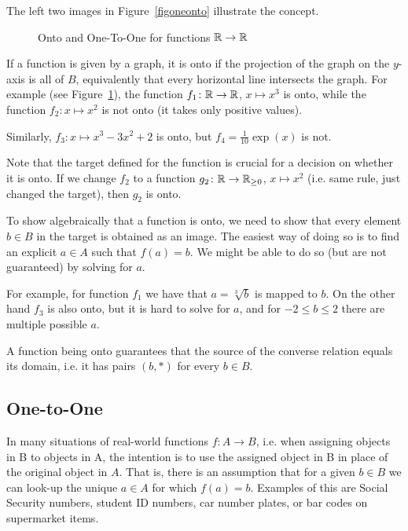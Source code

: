 The left two images in Figure~\ref{figoneonto} illustrate the concept.

\begin{figure}[t]
\begin{center}
\caption{Onto and One-To-One for functions ${\mathbb R}\to{\mathbb R}$}
\label{figoneontofcts}
\end{center}
\end{figure}

If a function is given by a graph, it is onto if the projection of the graph
on the $y$-axis is all of $B$, equivalently that every horizontal line intersects the
graph.
For example (see Figure~\ref{figoneontofcts}), the function $f_1\colon{\mathbb R}\to{\mathbb R}$, $x\mapsto x^3$ is onto, while
the function $f_2\colon x\mapsto x^2$ is not onto (it takes only positive
values).

Similarly, $f_3\colon x\mapsto x^3-3x^2+2$ is
onto, but $f_4=\frac{1}{10}\exp(x)$ is not.

Note that the target defined for the function is crucial for a decision on
whether it is onto. If we change $f_2$ to a function $g_2\colon{\mathbb R}\to{\mathbb R}_{\ge
0}$, $x\mapsto x^2$ (i.e. same rule, just changed the target), then $g_2$ is
onto.
\medskip

To show algebraically that a function is onto, we need to show that every
element $b\in B$ in the target is obtained as an image. The easiest way of
doing so is to find an explicit $a\in A$ such that $f(a)=b$. We might be
able to do so (but are not guaranteed) by solving for $a$.

For example, for function $f_1$ we have that $a=\sqrt[3]{b}$ is mapped to
$b$. On the other hand $f_3$ is also onto, but it is hard to solve for $a$,
and for $-2\le b\le 2$ there are multiple possible $a$.
\smallskip

A function being onto guarantees that the source of the converse relation
equals its domain, i.e. it has pairs
$(b,*)$ for every $b\in B$.

\subsection{One-to-One}

In many situations of real-world functions $f\colon A\to B$, i.e. when
assigning objects in B to objects in A, the
intention is to use the assigned object in B in place of the original object in $A$.
That is, there is an assumption that for a given $b\in B$ we can look-up the unique
$a\in A$ for which $f(a)=b$. Examples of this are Social Security numbers, student ID
numbers, car number plates,
or bar codes on supermarket items.

